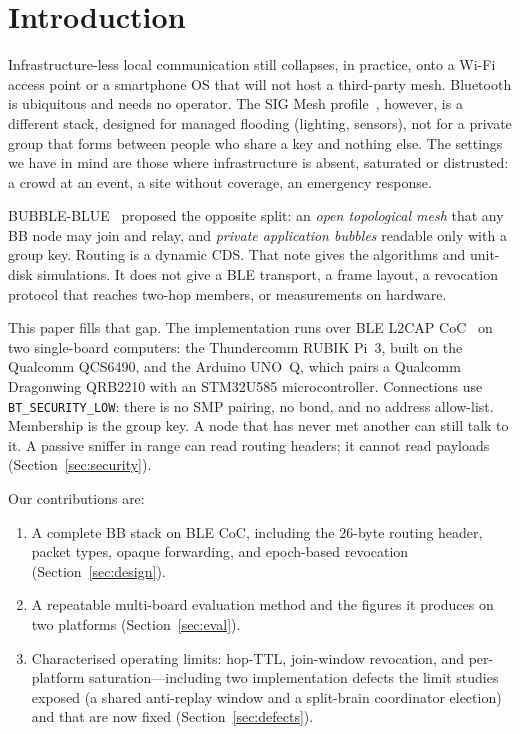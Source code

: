 \documentclass[conference,10pt]{IEEEtran}
\begin{document}
\section{Introduction}
\label{sec:intro}

Infrastructure-less local communication still collapses, in practice, onto
a Wi-Fi access point or a smartphone OS that will not host a third-party
mesh. Bluetooth is ubiquitous and needs no operator. The SIG Mesh
profile~\cite{mesh-profile}, however, is a different stack, designed for
managed flooding (lighting, sensors), not for a private group that forms
between people who share a key and nothing else. The settings we have in
mind are those where infrastructure is absent, saturated or distrusted: a
crowd at an event, a site without coverage, an emergency response.

BUBBLE-BLUE~\cite{achir2025bb} proposed the opposite split: an
\emph{open topological mesh} that any BB node may join and relay, and
\emph{private application bubbles} readable only with a group key.
Routing is a dynamic CDS. That note gives the algorithms and unit-disk
simulations. It does not give a BLE transport, a frame layout, a
revocation protocol that reaches two-hop members, or measurements on
hardware.

This paper fills that gap. The implementation runs over BLE L2CAP
CoC~\cite{btcore} on two single-board computers: the Thundercomm RUBIK
Pi~3, built on the Qualcomm QCS6490, and the Arduino UNO~Q, which pairs a
Qualcomm Dragonwing QRB2210 with an STM32U585 microcontroller. Connections use
\texttt{BT\_SECURITY\_LOW}: there is no SMP pairing, no bond, and no
address allow-list. Membership is the group key. A node that has never met
another can still talk to it. A passive sniffer in range can read routing
headers; it cannot read payloads (Section~\ref{sec:security}).

Our contributions are:
\begin{enumerate}
\item A complete BB stack on BLE CoC, including the 26-byte routing
  header, packet types, opaque forwarding, and epoch-based revocation
  (Section~\ref{sec:design}).
\item A repeatable multi-board evaluation method and the figures it
  produces on two platforms (Section~\ref{sec:eval}).
\item Characterised operating limits: hop-TTL, join-window revocation,
  and per-platform saturation---including two implementation defects the
  limit studies exposed (a shared anti-replay window and a split-brain
  coordinator election) and that are now fixed
  (Section~\ref{sec:defects}).
\end{enumerate}
\end{document}
